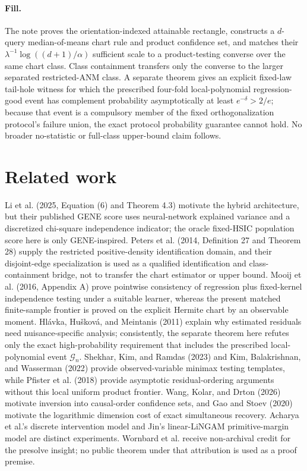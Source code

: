 \documentclass{article}
\begin{document}
\paragraph{Fill.} The note proves the orientation-indexed attainable rectangle, constructs a \(d\)-query median-of-means chart rule and product confidence set, and matches their \(\lambda^{-1}\log((d+1)/\alpha)\) sufficient scale to a product-testing converse over the same chart class. Class containment transfers only the converse to the larger separated restricted-ANM class. A separate theorem gives an explicit fixed-law tail-hole witness for which the prescribed four-fold local-polynomial regression-good event has complement probability asymptotically at least \(e^{-\delta}>2/e\); because that event is a compulsory member of the fixed orthogonalization protocol's failure union, the exact protocol probability guarantee cannot hold. No broader no-statistic or full-class upper-bound claim follows.

\section{Related work}

Li et al. (2025, Equation (6) and Theorem 4.3) motivate the hybrid architecture, but their published GENE score uses neural-network explained variance and a discretized chi-square independence indicator; the oracle fixed-HSIC population score here is only GENE-inspired. Peters et al. (2014, Definition 27 and Theorem 28) supply the restricted positive-density identification domain, and their disjoint-edge specialization is used as a qualified identification and class-containment bridge, not to transfer the chart estimator or upper bound. Mooij et al. (2016, Appendix A) prove pointwise consistency of regression plus fixed-kernel independence testing under a suitable learner, whereas the present matched finite-sample frontier is proved on the explicit Hermite chart by an observable moment. Hl\'avka, Hu\v{s}kov\'a, and Meintanis (2011) explain why estimated residuals need nuisance-specific analysis; consistently, the separate theorem here refutes only the exact high-probability requirement that includes the prescribed local-polynomial event \(\mathcal G_n\). Shekhar, Kim, and Ramdas (2023) and Kim, Balakrishnan, and Wasserman (2022) provide observed-variable minimax testing templates, while Pfister et al. (2018) provide asymptotic residual-ordering arguments without this local uniform product frontier. Wang, Kolar, and Drton (2026) motivate inversion into causal-order confidence sets, and Gao and Stoev (2020) motivate the logarithmic dimension cost of exact simultaneous recovery. Acharya et al.'s discrete intervention model and Jin's linear-LiNGAM primitive-margin model are distinct experiments. Wornbard et al. receive non-archival credit for the presolve insight; no public theorem under that attribution is used as a proof premise.
\end{document}
